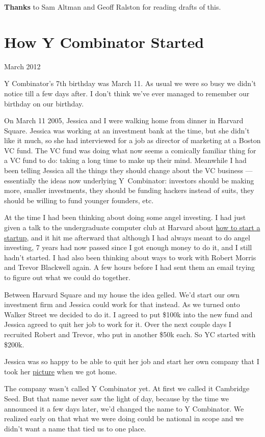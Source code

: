 \documentclass[12pt]{book}
\begin{document}
\textbf{Thanks} to Sam Altman and Geoff Ralston for reading drafts of
this.
\chapter{How Y Combinator Started}

March 2012

Y Combinator's 7th birthday was March 11. As usual we were so busy we
didn't notice till a few days after. I don't think we've ever managed to
remember our birthday on our birthday.

On March 11 2005, Jessica and I were walking home from dinner in Harvard
Square. Jessica was working at an investment bank at the time, but she
didn't like it much, so she had interviewed for a job as director of
marketing at a Boston VC fund. The VC fund was doing what now seems a
comically familiar thing for a VC fund to do: taking a long time to make
up their mind. Meanwhile I had been telling Jessica all the things they
should change about the VC business --- essentially the ideas now
underlying Y~Combinator: investors should be making more, smaller
investments, they should be funding hackers instead of suits, they
should be willing to fund younger founders, etc.

At the time I had been thinking about doing some angel investing. I had
just given a talk to the undergraduate computer club at Harvard about
\href{start.html}{how to start a startup}, and it hit me afterward that
although I had always meant to do angel investing, 7 years had now
passed since I got enough money to do it, and I still hadn't started. I
had also been thinking about ways to work with Robert Morris and Trevor
Blackwell again. A few hours before I had sent them an email trying to
figure out what we could do together.

Between Harvard Square and my house the idea gelled. We'd start our own
investment firm and Jessica could work for that instead. As we turned
onto Walker Street we decided to do it. I agreed to put \$100k into the
new fund and Jessica agreed to quit her job to work for it. Over the
next couple days I recruited Robert and Trevor, who put in another \$50k
each. So YC started with \$200k.

Jessica was so happy to be able to quit her job and start her own
company that I took her
\href{https://web.archive.org/web/20170609055553/http://www.ycombinator.com/yc05.html}{picture}
when we got home.

The company wasn't called Y Combinator yet. At first we called it
Cambridge Seed. But that name never saw the light of day, because by the
time we announced it a few days later, we'd changed the name to Y
Combinator. We realized early on that what we were doing could be
national in scope and we didn't want a name that tied us to one place.
\end{document}
